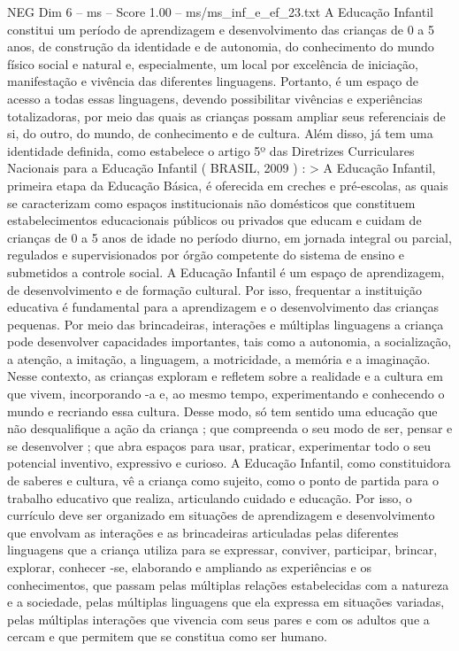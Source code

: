 \begin{textsample}{NEG Dim 6 – ms – Score 1.00 – ms/ms\_inf\_e\_ef\_23.txt}
A Educação Infantil constitui um período de aprendizagem e desenvolvimento das crianças de 0 a 5 anos, de construção da identidade e de autonomia, do conhecimento do mundo físico social e natural e, especialmente, um local por excelência de iniciação, manifestação e vivência das diferentes linguagens.
Portanto, é um espaço de acesso a todas essas linguagens, devendo possibilitar vivências e experiências totalizadoras, por meio das quais as crianças possam ampliar seus referenciais de si, do outro, do mundo, de conhecimento e de cultura.
Além disso, já tem uma identidade definida, como estabelece o artigo 5º das Diretrizes Curriculares Nacionais para a Educação Infantil ( BRASIL, 2009 ) : > A Educação Infantil, primeira etapa da Educação Básica, é oferecida em creches e pré-escolas, as quais se caracterizam como espaços institucionais não domésticos que constituem estabelecimentos educacionais públicos ou privados que educam e cuidam de crianças de 0 a 5 anos de idade no período diurno, em jornada integral ou parcial, regulados e supervisionados por órgão competente do sistema de ensino e submetidos a controle social.
A Educação Infantil é um espaço de aprendizagem, de desenvolvimento e de formação cultural.
Por isso, frequentar a instituição educativa é fundamental para a aprendizagem e o desenvolvimento das crianças pequenas.
Por meio das brincadeiras, interações e múltiplas linguagens a criança pode desenvolver capacidades importantes, tais como a autonomia, a socialização, a atenção, a imitação, a linguagem, a motricidade, a memória e a imaginação.
Nesse contexto, as crianças exploram e refletem sobre a realidade e a cultura em que vivem, incorporando -a e, ao mesmo tempo, experimentando e conhecendo o mundo e recriando essa cultura.
Desse modo, só tem sentido uma educação que não desqualifique a ação da criança ; que compreenda o seu modo de ser, pensar e se desenvolver ; que abra espaços para usar, praticar, experimentar todo o seu potencial inventivo, expressivo e curioso.
A Educação Infantil, como constituidora de saberes e cultura, vê a criança como sujeito, como o ponto de partida para o trabalho educativo que realiza, articulando cuidado e educação.
Por isso, o currículo deve ser organizado em situações de aprendizagem e desenvolvimento que envolvam as interações e as brincadeiras articuladas pelas diferentes linguagens que a criança utiliza para se expressar, conviver, participar, brincar, explorar, conhecer -se, elaborando e ampliando as experiências e os conhecimentos, que passam pelas múltiplas relações estabelecidas com a natureza e a sociedade, pelas múltiplas linguagens que ela expressa em situações variadas, pelas múltiplas interações que vivencia com seus pares e com os adultos que a cercam e que permitem que se constitua como ser humano.

\end{textsample}
